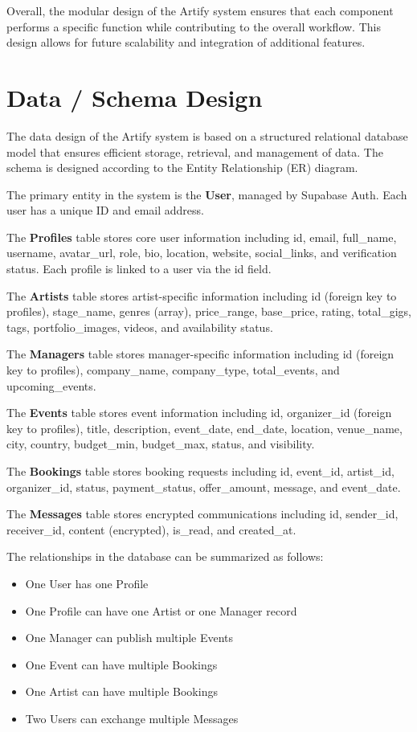 \documentclass[12pt,a4paper]{report}
\begin{document}
Overall, the modular design of the Artify system ensures that each component performs a specific function while contributing to the overall workflow. This design allows for future scalability and integration of additional features.

\section{Data / Schema Design}

The data design of the Artify system is based on a structured relational database model that ensures efficient storage, retrieval, and management of data. The schema is designed according to the Entity Relationship (ER) diagram.

The primary entity in the system is the \textbf{User}, managed by Supabase Auth. Each user has a unique ID and email address.

The \textbf{Profiles} table stores core user information including id, email, full\_name, username, avatar\_url, role, bio, location, website, social\_links, and verification status. Each profile is linked to a user via the id field.

The \textbf{Artists} table stores artist-specific information including id (foreign key to profiles), stage\_name, genres (array), price\_range, base\_price, rating, total\_gigs, tags, portfolio\_images, videos, and availability status.

The \textbf{Managers} table stores manager-specific information including id (foreign key to profiles), company\_name, company\_type, total\_events, and upcoming\_events.

The \textbf{Events} table stores event information including id, organizer\_id (foreign key to profiles), title, description, event\_date, end\_date, location, venue\_name, city, country, budget\_min, budget\_max, status, and visibility.

The \textbf{Bookings} table stores booking requests including id, event\_id, artist\_id, organizer\_id, status, payment\_status, offer\_amount, message, and event\_date.

The \textbf{Messages} table stores encrypted communications including id, sender\_id, receiver\_id, content (encrypted), is\_read, and created\_at.

The relationships in the database can be summarized as follows:

\begin{itemize}
    \item One User has one Profile
    \item One Profile can have one Artist or one Manager record
    \item One Manager can publish multiple Events
    \item One Event can have multiple Bookings
    \item One Artist can have multiple Bookings
    \item Two Users can exchange multiple Messages
\end{itemize}
\end{document}
